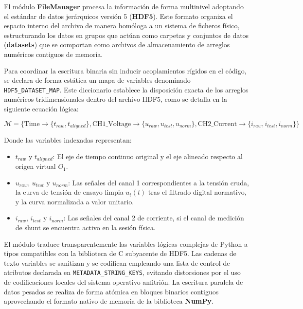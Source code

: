El módulo \textbf{FileManager} procesa la información de forma multinivel adoptando el estándar de datos jerárquicos versión 5 (\textbf{HDF5}). Este formato organiza el espacio interno del archivo de manera homóloga a un sistema de ficheros físico, estructurando los datos en grupos que actúan como carpetas y conjuntos de datos (\textbf{datasets}) que se comportan como archivos de almacenamiento de arreglos numéricos contiguos de memoria.

Para coordinar la escritura binaria sin inducir acoplamientos rígidos en el código, se declara de forma estática un mapa de variables denominado \texttt{HDF5\_DATASET\_MAP}. Este diccionario establece la disposición exacta de los arreglos numéricos tridimensionales dentro del archivo HDF5, como se detalla en la siguiente ecuación lógica:

\begin{equation}
\label{eq:dataset_map}
\mathcal{M} = \{ \text{Time} \rightarrow \{t_{raw}, t_{aligned}\}, \text{CH1\_Voltage} \rightarrow \{u_{raw}, u_{test}, u_{norm}\}, \text{CH2\_Current} \rightarrow \{i_{raw}, i_{test}, i_{norm}\} \}
\end{equation}

Donde las variables indexadas representan:
\begin{itemize}
    \item $t_{raw}$ y $t_{aligned}$: El eje de tiempo continuo original y el eje alineado respecto al origen virtual $O_1$.
    \item $u_{raw}$, $u_{test}$ y $u_{norm}$: Las señales del canal 1 correspondientes a la tensión cruda, la curva de tensión de ensayo limpia $u_t(t)$ tras el filtrado digital normativo, y la curva normalizada a valor unitario.
    \item $i_{raw}$, $i_{test}$ y $i_{norm}$: Las señales del canal 2 de corriente, si el canal de medición de shunt se encuentra activo en la sesión física.
\end{itemize}

El módulo traduce transparentemente las variables lógicas complejas de Python a tipos compatibles con la biblioteca de C subyacente de HDF5. Las cadenas de texto variables se sanitizan y se codifican empleando una lista de control de atributos declarada en \texttt{METADATA\_STRING\_KEYS}, evitando distorsiones por el uso de codificaciones locales del sistema operativo anfitrión. La escritura paralela de datos pesados se realiza de forma atómica en bloques binarios contiguos aprovechando el formato nativo de memoria de la biblioteca \textbf{NumPy}.

